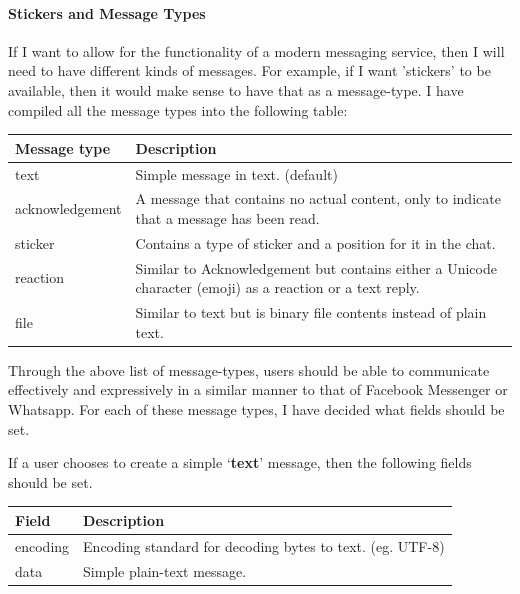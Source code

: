 \documentclass{article}
\begin{document}
\paragraph{Stickers and Message Types}
If I want to allow for the functionality of a modern messaging service, then I will need to have different kinds of messages. For example, if I want 'stickers' to be available, then it would make sense to have that as a message-type. I have compiled all the message types into the following table:
\begin{table}[H]
\centering
\begin{tabular}{|p{3cm}|p{8.5cm}|}
\hline
\rowcolor{tblgrey} 
Message type    & Description                                                                               \\ \hline
text            & Simple message in text. (default)                                                         \\ \hline
acknowledgement & A message that contains no actual content, only to indicate that a message has been read. \\ \hline
sticker         & Contains a type of sticker and a position for it in the chat.                                        \\ \hline
reaction        & Similar to Acknowledgement but contains either a Unicode character (emoji) as a reaction or a text reply. \\ \hline
file            & Similar to text but is binary file contents instead of plain text.                       \\ \hline
\end{tabular}
\end{table}

Through the above list of message-types, users should be able to communicate effectively and expressively in a similar manner to that of Facebook Messenger or Whatsapp. For each of these message types, I have decided what fields should be set.

If a user chooses to create a simple `\textbf{text}' message, then the following fields should be set.
\begin{table}[H]
\centering
\begin{tabular}{|p{2.5cm}|p{8.5cm}|}
\hline
\rowcolor{tblgrey} 
Field           & Description                                               \\ \hline
encoding        & Encoding standard for decoding bytes to text. (eg. UTF-8) \\ \hline
data            & Simple plain-text message.                                \\ \hline
\end{tabular}
\end{table}
\end{document}
